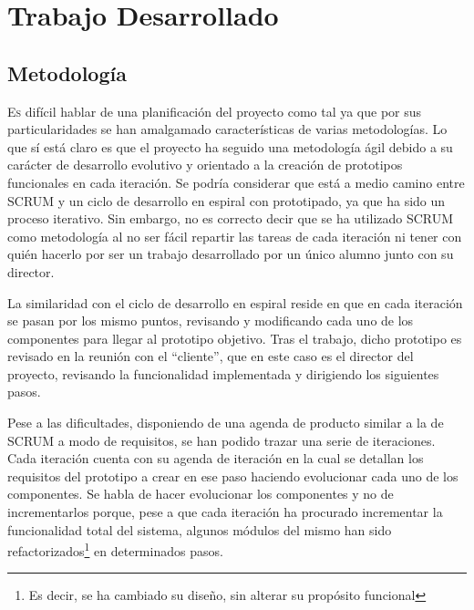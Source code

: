 \chapter{Trabajo Desarrollado}
\label{chap:desarrollo}
\vspace{0.5cm}


\section{Metodología}
\label{sec:metodology}
\lettrine{E}{s} difícil hablar de una planificación del proyecto como tal ya que por sus particularidades se han amalgamado características de varias metodologías. Lo que sí está claro es que el proyecto ha seguido una metodología ágil debido a su carácter de desarrollo evolutivo y orientado a la creación de prototipos funcionales en cada iteración. Se podría considerar que está a medio camino entre SCRUM y un ciclo de desarrollo en espiral con prototipado, ya que ha sido un proceso iterativo. Sin embargo, no es correcto decir que se ha utilizado SCRUM como metodología al no ser fácil repartir las tareas de cada iteración ni tener con quién hacerlo por ser un trabajo desarrollado por un único alumno junto con su director. 

La similaridad con el ciclo de desarrollo en espiral reside en que en cada iteración se pasan por los mismo puntos, revisando y modificando cada uno de los componentes para llegar al prototipo objetivo. Tras el trabajo, dicho prototipo es revisado en la reunión con el ``cliente'', que en este caso es el director del proyecto, revisando la funcionalidad implementada y dirigiendo los siguientes pasos.

Pese a las dificultades, disponiendo de una agenda de producto similar a la de SCRUM a modo de requisitos, se han podido trazar una serie de iteraciones. Cada iteración cuenta con su agenda de iteración en la cual se detallan los requisitos del prototipo a crear en ese paso haciendo evolucionar cada uno de los componentes. Se habla de hacer evolucionar los componentes y no de incrementarlos porque, pese a que cada iteración ha procurado incrementar la funcionalidad total del sistema, algunos módulos del mismo han sido refactorizados\footnote{Es decir, se ha cambiado su diseño, sin alterar su propósito funcional} en determinados pasos.

